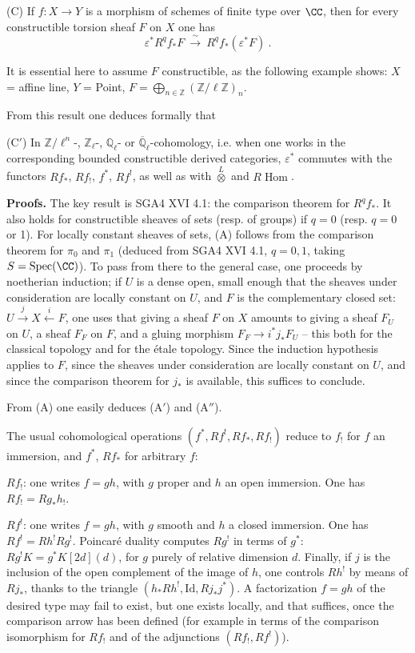\documentclass[12pt,oneside]{amsbook}
\theoremstyle{plain}
\theoremstyle{definition}
\newcommand{\ZZ}{\mathbb{Z}}  \newcommand{\QQ}{\mathbb{Q}}
\newcommand{\Zl}{\mathbb{Z}_{\ell}}
\newcommand{\Ql}{\mathbb{Q}_{\ell}}
\newcommand{\Qlb}{\overline{\mathbb{Q}}_{\ell}}
\DeclareMathOperator{\Spec}{Spec}
\newcommand{\RHom}{R\!\operatorname{Hom}}
\newcommand{\isoto}{\xrightarrow{\ \sim\ }}
\begin{document}
\smallskip
(C) If $f : X\to Y$ is a morphism of schemes of finite type over $\CC$, then for every constructible torsion sheaf $F$ on $X$ one has
\[ \varepsilon^{*}R^{q}f_{*}F\ \isoto\ R^{q}f_{*}(\varepsilon^{*}F)\ . \]

It is essential here to assume $F$ constructible, as the following example shows: $X$ = affine line, $Y$ = Point, $F = \bigoplus_{n\in\ZZ}(\ZZ/\ell\ZZ)_{n}$.

\smallskip
From this result one deduces formally that

\smallskip
(C$'$) In $\ZZ/\ell^{n}$-, $\Zl$-, $\Ql$- or $\Qlb$-cohomology, i.e. when one works in the corresponding bounded constructible derived categories, $\varepsilon^{*}$ commutes with the functors $Rf_{*}$, $Rf_{!}$, $f^{*}$, $Rf^{!}$, as well as with $\overset{L}{\otimes}$ and $\RHom$.

\smallskip
\textbf{Proofs.} The key result is SGA4 XVI 4.1: the comparison theorem for $R^{q}f_{*}$. It also holds for constructible sheaves of sets (resp. of groups) if $q=0$ (resp. $q=0$ or 1). For locally constant sheaves of sets,
(A) follows from the comparison theorem for $\pi_{0}$ and $\pi_{1}$ (deduced from SGA4 XVI 4.1, $q=0,1$, taking $S=\Spec(\CC)$). To pass from there to the general case, one proceeds by noetherian induction; if $U$ is a dense open, small enough that the sheaves under consideration are locally constant on $U$, and $F$ is the complementary closed set: $U\xrightarrow{\ j\ }X\xleftarrow{\ i\ }F$, one uses that giving a sheaf $F$ on $X$ amounts to giving a sheaf $F_{U}$ on $U$, a sheaf $F_{F}$ on $F$, and a gluing morphism $F_{F}\to i^{*}j_{*}F_{U}$ -- this both for the classical topology and for the étale topology. Since the induction hypothesis applies to $F$, since the sheaves under consideration are locally constant on $U$, and since the comparison theorem for $j_{*}$ is available, this suffices to conclude.

From (A) one easily deduces (A$'$) and (A$''$).

\smallskip
The usual cohomological operations $(f^{*},Rf^{!},Rf_{*},Rf_{!})$ reduce to $f_{!}$ for $f$ an immersion, and $f^{*}$, $Rf_{*}$ for arbitrary $f$:

\smallskip
$Rf_{!}$: one writes $f = gh$, with $g$ proper and $h$ an open immersion. One has $Rf_{!} = Rg_{*}h_{!}$.

\smallskip
$Rf^{!}$: one writes $f = gh$, with $g$ smooth and $h$ a closed immersion. One has $Rf^{!} = Rh^{!}Rg^{!}$. Poincaré duality computes $Rg^{!}$ in terms of $g^{*}$: $Rg^{!}K = g^{*}K[2d](d)$, for $g$ purely of relative dimension $d$. Finally, if $j$ is the inclusion of the open complement of the image of $h$, one controls $Rh^{!}$ by means of $Rj_{*}$, thanks to the triangle $(h_{*}Rh^{!},\mathrm{Id},Rj_{*}j^{*})$. A factorization $f=gh$ of the desired type may fail to exist, but one exists locally, and that suffices, once the comparison arrow has been defined (for example in terms of the comparison isomorphism for $Rf_{!}$ and of the adjunctions $(Rf_{!},Rf^{!})$).
\end{document}
